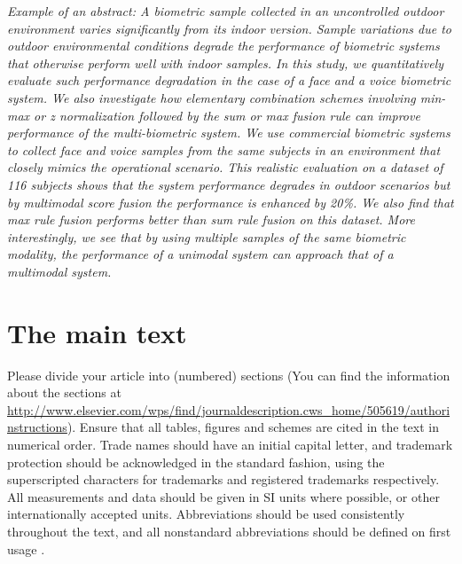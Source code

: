 \documentclass[times,onecolumn,final,longtitle]{elsarticle}
\begin{document}
\textit{Example of an abstract: A biometric sample collected in an
  uncontrolled outdoor environment varies significantly from its
  indoor version. Sample variations due to outdoor environmental
  conditions degrade the performance of biometric systems that
  otherwise perform well with indoor samples. In this study, we
  quantitatively evaluate such performance degradation in the case
  of a face and a voice biometric system. We also investigate how
  elementary combination schemes involving min-max or z
  normalization followed by the sum or max fusion rule can
  improve performance of the multi-biometric system. We use
  commercial biometric systems to collect face and voice samples
  from the same subjects in an environment that closely mimics the
  operational scenario. This realistic evaluation on a dataset of
  116 subjects shows that the system performance degrades in
  outdoor scenarios but by multimodal score fusion the
  performance is enhanced by 20\%. We also find that max rule
  fusion performs better than sum rule fusion on this dataset. More
  interestingly, we see that by using multiple samples of the same
  biometric modality, the performance of a unimodal system can
  approach that of a multimodal system.}

\section{The main text}

Please divide your article into (numbered) sections (You can find the
information about the sections at
\url{http://www.elsevier.com/wps/find/journaldescription.cws_home/505619/authorinstructions}).
Ensure that all tables, figures and schemes are cited in the text in
numerical order. Trade names should have an initial capital letter, and
trademark protection should be acknowledged in the standard fashion,
using the superscripted characters for trademarks and registered
trademarks respectively. All measurements and data should be given in
SI units where possible, or other internationally accepted units.
Abbreviations should be used consistently throughout the text, and all
nonstandard abbreviations should be defined on first usage
\cite{Vehlowetal2013}.
\end{document}

